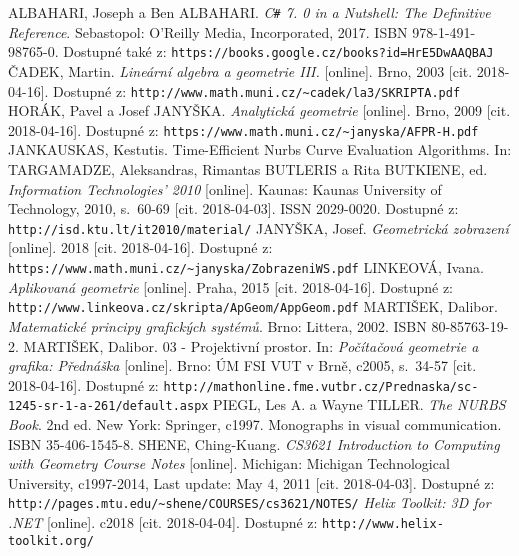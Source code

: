 {}
\begin{thebibliography}{11}
	ALBAHARI, Joseph a Ben ALBAHARI. \textit{C\texttt{\#} 7. 0 in a Nutshell: The Definitive Reference}. Sebastopol: O'Reilly Media, Incorporated, 2017. ISBN 978-1-491-98765-0. Dostupné také z: \verb|https://books.google.cz/books?id=HrE5DwAAQBAJ|
	ČADEK, Martin. \textit{Lineární algebra a geometrie III.} [online]. Brno, 2003 [cit. 2018-04-16]. Dostupné z: \verb|http://www.math.muni.cz/~cadek/la3/SKRIPTA.pdf|
	HORÁK, Pavel a Josef JANYŠKA. \textit{Analytická geometrie} [online]. Brno, 2009 [cit. 2018-04-16]. Dostupné z: \verb|https://www.math.muni.cz/~janyska/AFPR-H.pdf|
	JANKAUSKAS, Kestutis. Time-Efficient Nurbs Curve Evaluation Algorithms. In: TARGAMADZE, Aleksandras, Rimantas BUTLERIS a Rita BUTKIENE, ed. \textit{Information Technologies' 2010} [online]. Kaunas: Kaunas University of Technology, 2010, s.~60-69 [cit. 2018-04-03]. ISSN 2029-0020. Dostupné z: \verb|http://isd.ktu.lt/it2010/material/|
	JANYŠKA, Josef. \textit{Geometrická zobrazení} [online]. 2018 [cit. 2018-04-16]. Dostupné z: \verb|https://www.math.muni.cz/~janyska/ZobrazeniWS.pdf|
	LINKEOVÁ, Ivana. \textit{Aplikovaná geometrie} [online]. Praha, 2015 [cit. 2018-04-16]. Dostupné z: \verb|http://www.linkeova.cz/skripta/ApGeom/AppGeom.pdf|
	MARTIŠEK, Dalibor. \textit{Matematické principy grafických systémů}. Brno: Littera, 2002. ISBN 80-85763-19-2.
	MARTIŠEK, Dalibor. 03 - Projektivní prostor. In: \textit{Počítačová geometrie a grafika: Přednáška} [online]. Brno: ÚM FSI VUT v Brně, c2005, s.~34-57 [cit. 2018-04-16]. Dostupné z: \verb|http://mathonline.fme.vutbr.cz/Prednaska/sc-1245-sr-1-a-261/default.aspx|
	PIEGL, Les A. a Wayne TILLER. \textit{The NURBS Book}. 2nd ed. New York: Springer, c1997. Monographs in visual communication. ISBN 35-406-1545-8.
	SHENE, Ching-Kuang. \textit{CS3621 Introduction to Computing with Geometry Course Notes} [online]. Michigan: Michigan Technological University, c1997-2014, Last update: May 4, 2011 [cit. 2018-04-03]. Dostupné z: \verb|http://pages.mtu.edu/~shene/COURSES/cs3621/NOTES/|
	\textit{Helix Toolkit: 3D for .NET} [online]. c2018 [cit. 2018-04-04]. Dostupné z: \verb|http://www.helix-toolkit.org/|
	
\end{thebibliography}